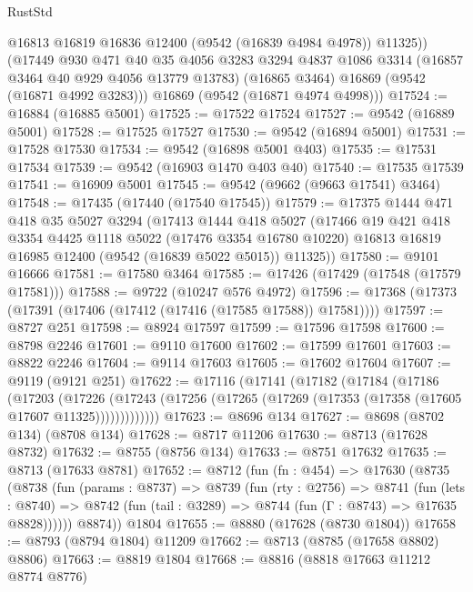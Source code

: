 \begin{lexlean}{RustStd}
\begin{coremodule}
          @16813
          @16819
          @16836
          @12400
          (@9542 (@16839 @4984 @4978))
          @11325))
      (@17449
        @930
        @471
        @40
        @35
        @4056
        @3283
        @3294
        @4837
        @1086
        @3314
        (@16857 @3464 @40 @929 @4056 @13779 @13783)
        (@16865 @3464)
        @16869
        (@9542 (@16871 @4992 @3283)))
      @16869
      (@9542 (@16871 @4974 @4998)))
@17524 := @16884 (@16885 @5001)
@17525 := @17522 @17524
@17527 := @9542 (@16889 @5001)
@17528 := @17525 @17527
@17530 := @9542 (@16894 @5001)
@17531 := @17528 @17530
@17534 := @9542 (@16898 @5001 @403)
@17535 := @17531 @17534
@17539 := @9542 (@16903 @1470 @403 @40)
@17540 := @17535 @17539
@17541 := @16909 @5001
@17545 := @9542 (@9662 (@9663 @17541) @3464)
@17548 := @17435 (@17440 (@17540 @17545))
@17579 := @17375
    @1444
    @471
    @418
    @35
    @5027
    @3294
    (@17413
      @1444
      @418
      @5027
      (@17466
        @19
        @421
        @418
        @3354
        @4425
        @1118
        @5022
        (@17476 @3354 @16780 @10220)
        @16813
        @16819
        @16985
        @12400
        (@9542 (@16839 @5022 @5015))
        @11325))
@17580 := @9101 @16666
@17581 := @17580 @3464
@17585 := @17426 (@17429 (@17548 (@17579 @17581)))
@17588 := @9722 (@10247 @576 @4972)
@17596 := @17368 (@17373 (@17391 (@17406 (@17412 (@17416 (@17585 @17588)) @17581))))
@17597 := @8727 @251
@17598 := @8924 @17597
@17599 := @17596 @17598
@17600 := @8798 @2246
@17601 := @9110 @17600
@17602 := @17599 @17601
@17603 := @8822 @2246
@17604 := @9114 @17603
@17605 := @17602 @17604
@17607 := @9119 (@9121 @251)
@17622 := @17116
    (@17141
      (@17182
        (@17184
          (@17186
            (@17203
              (@17226
                (@17243 (@17256 (@17265 (@17269 (@17353 (@17358 (@17605 @17607 @11325)))))))))))))
@17623 := @8696 @134
@17627 := @8698 (@8702 @134) (@8708 @134)
@17628 := @8717 @11206
@17630 := @8713 (@17628 @8732)
@17632 := @8755 (@8756 @134)
@17633 := @8751 @17632
@17635 := @8713 (@17633 @8781)
@17652 := @8712
    (fun (fn : @454) =>
    @17630
      (@8735
        (@8738
          (fun (params : @8737) =>
          @8739
            (fun (rty : @2756) =>
            @8741
              (fun (lets : @8740) =>
              @8742 (fun (tail : @3289) => @8744 (fun (Γ : @8743) => @17635 @8828))))))
        @8874))
    @1804
@17655 := @8880 (@17628 (@8730 @1804))
@17658 := @8793 (@8794 @1804) @11209
@17662 := @8713 (@8785 (@17658 @8802) @8806)
@17663 := @8819 @1804
@17668 := @8816 (@8818 @17663 @11212 @8774 @8776)

\end{coremodule}
\end{lexlean}
